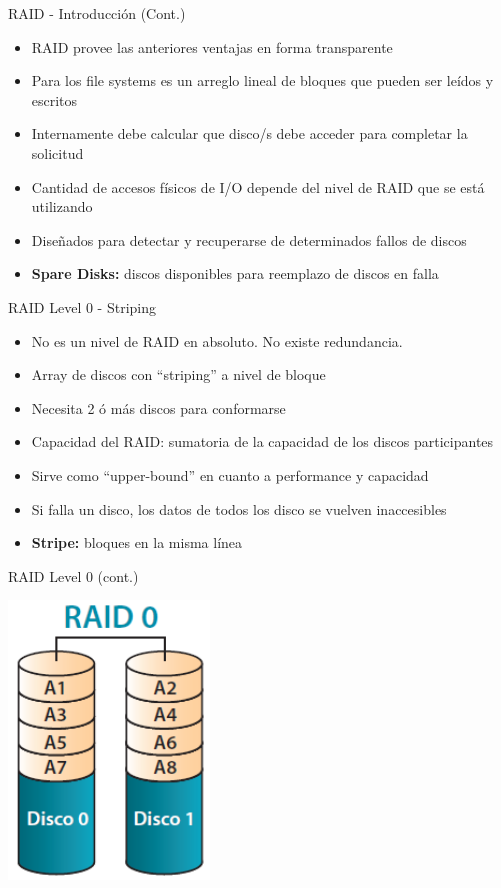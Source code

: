 \begin{frame}{RAID - Introducción (Cont.)}
  \begin{itemize}
   \item RAID provee las anteriores ventajas en forma transparente
   \item Para los file systems es un arreglo lineal de bloques que pueden ser leídos y escritos
   \item Internamente debe calcular que disco/s debe acceder para completar la solicitud
   \item Cantidad de accesos físicos de I/O depende del nivel de RAID que se está utilizando
   \item Diseñados para detectar y recuperarse de determinados fallos de discos
   \item {\bf Spare Disks:} discos disponibles para reemplazo de discos en falla  
  \end{itemize}
\end{frame}

\begin{frame}{RAID Level 0 - Striping}
 \begin{itemize}
  \item No es un nivel de RAID en absoluto. No existe redundancia. 
  \item Array de discos con “striping” a nivel de bloque
  \item Necesita 2 ó más discos para conformarse
  \item Capacidad del RAID: sumatoria de la capacidad de los discos participantes
  \item Sirve como ``upper-bound'' en cuanto a performance y capacidad  
  \item Si falla un disco, los datos de todos los disco se vuelven inaccesibles
  \item {\bf Stripe:} bloques en la misma línea 
 \end{itemize}
\end{frame} 

\begin{frame}{RAID Level 0 (cont.)}
 \begin{center}
  \includegraphics[width=0.4\textwidth]{images/raid0.png}
 \end{center}
\end{frame}

